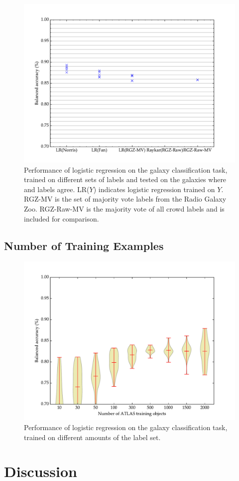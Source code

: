 
    \begin{figure}[!ht]
      \centering
      \includegraphics[width=\textwidth]{images/experiments/predictors.pdf}
      \caption{Performance of logistic regression on the galaxy classification task, trained on different sets of labels and tested on the galaxies where \citeauthor{norris06} and \citeauthor{fan15} labels agree. LR($Y$) indicates logistic regression trained on $Y$. RGZ-MV is the set of majority vote labels from the Radio Galaxy Zoo. RGZ-Raw-MV is the majority vote of all crowd labels and is included for comparison.}
    \end{figure}

  \subsection{Number of Training Examples}

    \begin{figure}[!ht]
      \centering
      \includegraphics[width=\textwidth]{images/experiments/passive.pdf}
      \caption{Performance of logistic regression on the galaxy classification task, trained on different amounts of the \citeauthor{norris06} label set.}
    \end{figure}

\section{Discussion}
\label{sec:rgz-discussion}